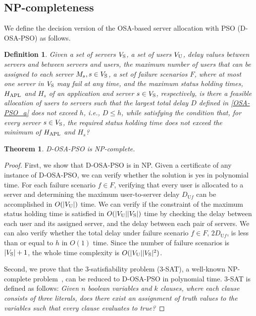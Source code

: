\documentclass[10pt, letterpaper]{IEEEtran}
\newtheorem{thm}{Theorem} %
\newtheorem{definition}{Definition}
\begin{document}
\begin{CJK}{UTF8}{ipxm}
\section{NP-completeness}
\label{sec:NP-Completeness}

We define the decision version of the OSA-based server allocation with PSO (D-OSA-PSO) as follows.
\begin{definition}
    Given a set of servers $V_{\rm{S}}$, a set of users $V_{\rm{U}}$, delay values between servers and between servers and users, the maximum number of users that can be assigned to each server $M_s, s \in V_{\rm{S}}$, a set of failure scenarios $F$, where at most one server in $V_{\rm{S}}$ may fail at any time, 
    and the maximum status holding times, $H_{\rm APL}$ and $H_s$ of an application and server $s \in V_{\rm{S}}$, respectively, 
    is there a feasible allocation of users to servers such that the largest total delay $D$ defined in \eqref{OSA-PSO_a} does not exceed $h$, i.e., $D \leq h$, while satisfying the condition that, for every server $s \in V_{\rm{S}}$, the required status holding time does not exceed the minimum of $H_{\rm APL}$ and $H_s$?
\end{definition}
\begin{thm}
D-OSA-PSO is NP-complete.
\end{thm}
\begin{proof}
  First, we show that D-OSA-PSO is in NP.
  Given a certificate of any instance of D-OSA-PSO, we can verify whether the solution is yes in polynomial time.  %
  For each failure scenario $f \in F$, verifying that every user is allocated to a server and determining the maximum user-to-server delay $D_{\mathrm{U}f}$ can be accomplished in $O(|V_{\rm{U}}|)$ time.
  We can verify if the constraint of the maximum status holding time is satisfied in $O(|V_{\rm{U}}||V_{\rm{S}}|)$ time by checking the delay between each user and its assigned server, and the delay between each pair of servers.
  We can also verify whether the total delay under failure scenario $f \in F$, $2D_{\mathrm{U}f}$, is less than or equal to $h$ in $O(1)$ time.
  Since the number of failure scenarios is $|V_{\rm{S}}|+1$, the whole time complexity is $O(|V_{\rm{U}}||V_{\rm{S}}|^2)$.

  Second, we prove that the 3-satisfiability problem (3-SAT), a well-known NP-complete problem~\cite{3_12_3SAT}, can be reduced to D-OSA-PSO in polynomial time. 
  3-SAT is defined as follows:
  {\it Given $n$ boolean variables and $k$ clauses, where each clause consists of three literals, does there exist an assignment of truth values to the variables such that every clause evaluates to true?}


\end{proof}
\end{CJK}
\end{document}
